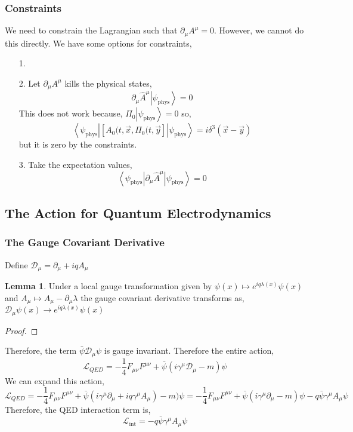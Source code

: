 \documentclass[12pt]{extarticle}
\newcommand{\bra}[1]{\left| #1 \right>}
\newcommand{\ket}[1]{\left| #1 \right>}
\renewcommand{\bra}[1]{\left< #1 \right|}
\newcommand{\lagrange}{\mathcal{L}}
\theoremstyle{definition}
\newtheorem{lemma}[theorem]{Lemma}
\begin{document}
\subsubsection{Constraints} 
We need to constrain the Lagrangian such that $\partial_\mu A^\mu = 0$. However, we cannot do this directly. 
We have some options for constraints,
\begin{enumerate}
\item[1.] 

\item[2.] Let $\partial_\mu A^\mu$ kills the physical states,
\[ \partial_\mu \hat{A}^\mu \ket{\psi_{\text{phys}}} = 0 \]
This does not work because, $\Pi_0 \ket{\psi_{\text{phys}}} = 0$ so,
\[ \bra{\psi_{\text{phys}}} [ A_0(t, \vec{x}, \Pi_0(t, \vec{y} ] \ket{\psi_{\text{phys}}} = i \delta^3(\vec{x} - \vec{y}) \]
but it is zero by the constraints. 

\item[3.] Take the expectation values,
\[ \bra{\psi_{\text{phys}}} \partial_\mu \hat{A}^\mu \ket{\psi_{\text{phys}}}  = 0 \]
\end{enumerate}

\subsection{The Action for Quantum Electrodynamics}

\subsubsection{The Gauge Covariant Derivative}

Define $\mathcal{D}_\mu = \partial_\mu + iq A_\mu$ 

\begin{lemma}
Under a local gauge transformation given by $\psi(x) \mapsto e^{i q \lambda(x) } \psi(x)$ and $A_\mu \mapsto A_\mu - \partial_\mu \lambda$ the gauge covariant derivative transforms as, 
$\mathcal{D}_\mu \psi(x) \to e^{i q \lambda(x) } \psi(x)$
\end{lemma}

\begin{proof}

\end{proof}

Therefore, the term $\bar{\psi} \mathcal{D}_\mu \psi$ is gauge invariant. Therefore the entire action,
\[ \lagrange_{QED} = - \frac{1}{4} F_{\mu \nu} F^{\mu \nu} + \bar{\psi} (i \gamma^\mu \mathcal{D}_\mu - m ) \psi \]
We can expand this action,
\[ \lagrange_{QED} = - \frac{1}{4} F_{\mu \nu} F^{\mu \nu} + \bar{\psi} (i \gamma^\mu \partial_\mu + i q \gamma^\mu A_\mu) - m ) \psi = - \frac{1}{4} F_{\mu \nu} F^{\mu \nu} + \bar{\psi} (i \gamma^\mu \partial_\mu - m ) \psi -  q \bar{\psi} \gamma^\mu A_\mu \psi \]
Therefore, the QED interaction term is,
\[ \lagrange_{\text{int}} = - q \bar{\psi} \gamma^\mu A_\mu \psi \]
\end{document}
